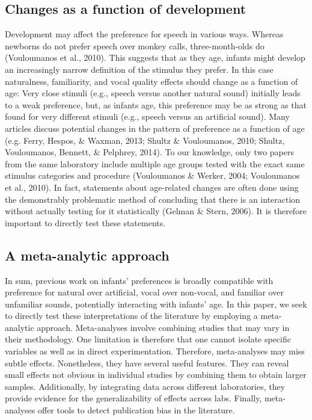\documentclass[man,floatsintext]{apa6}
\begin{document}
\subsection{Changes as a function of
development}\label{changes-as-a-function-of-development}

Development may affect the preference for speech in various ways.
Whereas newborns do not prefer speech over monkey calls,
three-month-olds do (Vouloumanos et al., 2010). This suggests that as
they age, infants might develop an increasingly narrow definition of the
stimulus they prefer. In this case naturalness, familiarity, and vocal
quality effects should change as a function of age: Very close stimuli
(e.g., speech versus another natural sound) initially leads to a weak
preference, but, as infants age, this preference may be as strong as
that found for very different stimuli (e.g., speech versus an artificial
sound). Many articles discuss potential changes in the pattern of
preference as a function of age (e.g. Ferry, Hespos, \& Waxman, 2013;
Shultz \& Vouloumanos, 2010; Shultz, Vouloumanos, Bennett, \& Pelphrey,
2014). To our knowledge, only two papers from the same laboratory
include multiple age groups tested with the exact same stimulus
categories and procedure (Vouloumanos \& Werker, 2004; Vouloumanos et
al., 2010). In fact, statements about age-related changes are often done
using the demonstrably problematic method of concluding that there is an
interaction without actually testing for it statistically (Gelman \&
Stern, 2006). It is therefore important to directly test these
statements.

\subsection{A meta-analytic approach}\label{a-meta-analytic-approach}

In sum, previous work on infants' preferences is broadly compatible with
preference for natural over artificial, vocal over non-vocal, and
familiar over unfamiliar sounds, potentially interacting with infants'
age. In this paper, we seek to directly test these interpretations of
the literature by employing a meta-analytic approach. Meta-analyses
involve combining studies that may vary in their methodology. One
limitation is therefore that one cannot isolate specific variables as
well as in direct experimentation. Therefore, meta-analyses may miss
subtle effects. Nonetheless, they have several useful features. They can
reveal small effects not obvious in individual studies by combining them
to obtain larger samples. Additionally, by integrating data across
different laboratories, they provide evidence for the generalizability
of effects across labs. Finally, meta-analyses offer tools to detect
publication bias in the literature.
\end{document}
